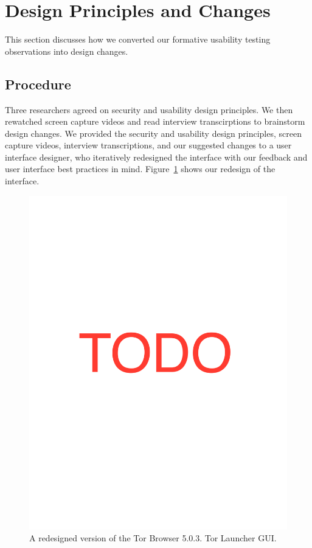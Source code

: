 \documentclass[USenglish,oneside,twocolumn]{article}
\begin{document}
\section{Design Principles and Changes}
\label{sec:design} 
This section discusses how we converted our formative usability testing observations into design changes. 

\subsection{Procedure} 
Three researchers agreed on security and usability design principles. 
We then rewatched screen capture videos and read interview transcirptions to brainstorm design changes. We provided the security and usability design principles, screen capture videos, interview transcriptions, and our suggested changes to a user interface designer, who iteratively redesigned the interface with our feedback and user interface best practices in mind. Figure~\ref{fig:new-interface} shows our redesign of the interface. 

\begin{figure}
\centering
\includegraphics[width=\textwidth]{placeholder-fullpage.pdf}
\caption{
A redesigned version of the Tor Browser 5.0.3. Tor Launcher GUI. 
}
\label{fig:new-interface}
\end{figure} 
\end{document}
